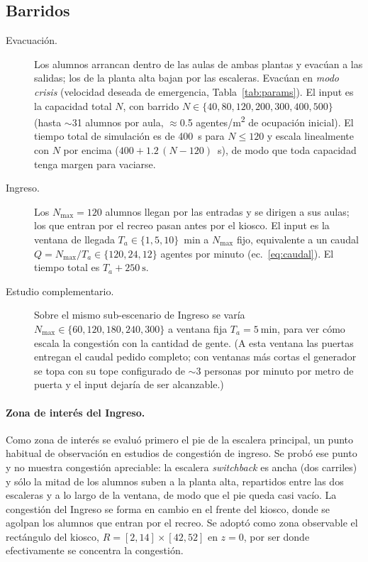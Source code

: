 \documentclass[11pt,a4paper]{article}
\begin{document}
\subsection{Barridos}

\begin{description}
  \item[Evacuación.] Los alumnos arrancan dentro de las aulas de ambas plantas y evacúan a las
  salidas; los de la planta alta bajan por las escaleras. Evacúan en \emph{modo crisis}
  (velocidad deseada de emergencia, Tabla~\ref{tab:params}). El input es la capacidad total $N$, con barrido
  $N\in\{40,80,120,200,300,400,500\}$ (hasta $\sim$31 alumnos por aula, $\approx$0.5
  agentes/\si{\metre\squared} de ocupación inicial). El tiempo total de simulación es de
  \SI{400}{\second} para $N\le 120$ y escala linealmente con $N$ por encima
  ($400 + 1.2\,(N-120)$~\si{\second}), de modo que toda capacidad tenga margen para vaciarse.
  \item[Ingreso.] Los $N_{\max}=120$ alumnos llegan por las entradas y se dirigen a sus aulas;
  los que entran por el recreo pasan antes por el kiosco. El input es la ventana de llegada
  $T_a\in\{1,5,10\}$~\si{\minute} a $N_{\max}$ fijo, equivalente a un caudal
  $Q=N_{\max}/T_a\in\{120,24,12\}$ agentes por minuto (ec.~\ref{eq:caudal}). El tiempo total es
  $T_a + \SI{250}{\second}$.
  \item[Estudio complementario.] Sobre el mismo sub-escenario de Ingreso se varía $N_{\max}\in
  \{60,120,180,240,300\}$ a ventana fija $T_a=\SI{5}{\minute}$, para ver cómo escala la
  congestión con la cantidad de gente. (A esta ventana las puertas entregan el caudal pedido
  completo; con ventanas más cortas el generador se topa con su tope configurado de
  $\sim$3 personas por minuto por metro de puerta y el input dejaría de ser alcanzable.)
\end{description}

\paragraph{Zona de interés del Ingreso.}
Como zona de interés se evaluó primero el pie de la escalera principal, un punto habitual de
observación en estudios de congestión de ingreso. Se probó ese punto y no muestra congestión
apreciable: la escalera \emph{switchback} es ancha (dos carriles) y sólo la mitad de los alumnos
suben a la planta alta, repartidos entre las dos escaleras y a lo largo de la ventana, de modo
que el pie queda casi vacío. La congestión del Ingreso se forma en cambio en el frente del
kiosco, donde se agolpan los alumnos que entran por el recreo. Se adoptó como zona observable el
rectángulo del kiosco, $R=[2,14]\times[42,52]$ en $z=0$, por ser donde efectivamente se concentra
la congestión.
\end{document}
